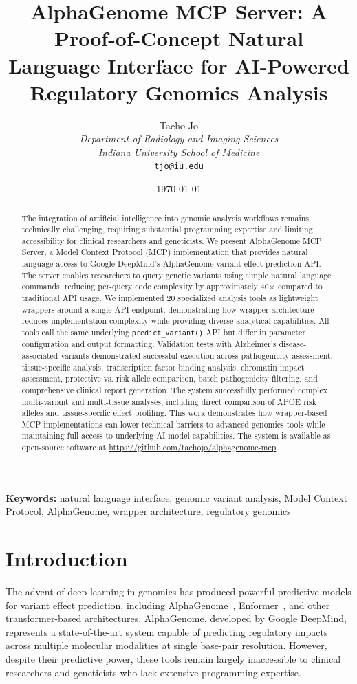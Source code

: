 \documentclass[11pt]{article}
\title{\textbf{AlphaGenome MCP Server: A Proof-of-Concept Natural Language Interface for AI-Powered Regulatory Genomics Analysis}}
\author{
Taeho Jo\\
\textit{Department of Radiology and Imaging Sciences}\\
\textit{Indiana University School of Medicine}\\
\texttt{tjo@iu.edu}
}
\date{\today}
\begin{document}
\maketitle

\begin{abstract}
The integration of artificial intelligence into genomic analysis workflows remains technically challenging, requiring substantial programming expertise and limiting accessibility for clinical researchers and geneticists. We present AlphaGenome MCP Server, a Model Context Protocol (MCP) implementation that provides natural language access to Google DeepMind's AlphaGenome variant effect prediction API. The server enables researchers to query genetic variants using simple natural language commands, reducing per-query code complexity by approximately 40$\times$ compared to traditional API usage. We implemented 20 specialized analysis tools as lightweight wrappers around a single API endpoint, demonstrating how wrapper architecture reduces implementation complexity while providing diverse analytical capabilities. All tools call the same underlying \texttt{predict\_variant()} API but differ in parameter configuration and output formatting. Validation tests with Alzheimer's disease-associated variants demonstrated successful execution across pathogenicity assessment, tissue-specific analysis, transcription factor binding analysis, chromatin impact assessment, protective vs. risk allele comparison, batch pathogenicity filtering, and comprehensive clinical report generation. The system successfully performed complex multi-variant and multi-tissue analyses, including direct comparison of APOE risk alleles and tissue-specific effect profiling. This work demonstrates how wrapper-based MCP implementations can lower technical barriers to advanced genomics tools while maintaining full access to underlying AI model capabilities. The system is available as open-source software at \url{https://github.com/taehojo/alphagenome-mcp}.
\end{abstract}

\noindent\textbf{Keywords:} natural language interface, genomic variant analysis, Model Context Protocol, AlphaGenome, wrapper architecture, regulatory genomics

\section{Introduction}

The advent of deep learning in genomics has produced powerful predictive models for variant effect prediction, including AlphaGenome~\cite{alphagenome2025}, Enformer~\cite{avsec2021}, and other transformer-based architectures. AlphaGenome, developed by Google DeepMind, represents a state-of-the-art system capable of predicting regulatory impacts across multiple molecular modalities at single base-pair resolution. However, despite their predictive power, these tools remain largely inaccessible to clinical researchers and geneticists who lack extensive programming expertise.
\end{document}
